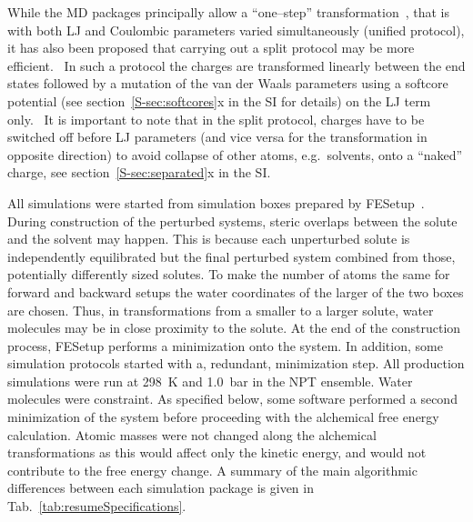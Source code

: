 \documentclass[journal=jctcce,manuscript=article]{achemso}
\begin{document}
While the MD packages principally allow a ``one--step''
transformation~\cite{steinbrecher_soft-core_2011},
that is with both LJ and Coulombic parameters varied
simultaneously (unified protocol), it has also been proposed that carrying out a
split protocol may be more efficient.~\cite{Deng-2004, naden_linear_2014, naden_linear_2015}
In such a protocol the charges are transformed
linearly between the end states followed by a mutation of the van der
Waals parameters using a softcore
potential (see section~\ref{S-sec:softcores}x in the
SI for details) on the LJ term only.~\cite{beutler_avoiding_1994,
  zacharias_separationshifted_1994}  It is important to note that in the split protocol, charges have to be switched off before LJ parameters (and vice versa
for the transformation in opposite direction) to avoid collapse of
other atoms, e.g.\ solvents, onto a ``naked''
charge,\cite{pitera_comparison_2002, anwar_robust_2005,
steinbrecher_soft-core_2011} see section~\ref{S-sec:separated}x in the SI.

All simulations were started from simulation boxes prepared by
FESetup~\cite{loeffler_fesetup:_2015}.  During construction of the
perturbed systems, steric overlaps between the solute and the
solvent may happen.  This is because each unperturbed solute is independently
equilibrated but the final perturbed system combined from those, potentially
differently sized solutes.  To make the number of atoms the same for forward
and backward setups the water coordinates of the larger of the two boxes are
chosen.  Thus, in transformations from a smaller to a larger solute, water
molecules may be in close proximity to the solute.  At the end of the
construction process, FESetup performs a minimization onto the
system.  In addition, some simulation protocols started with a,
redundant, minimization step.  All production simulations were run at
\SI{298}{K} and \SI{1.0}{bar} in the NPT ensemble.  Water molecules
were constraint.  As specified below, some software performed a second
minimization of the system before proceeding with the alchemical free
energy calculation.  Atomic masses were not changed along the
alchemical transformations as this would affect only the kinetic
energy, and would not contribute to the free energy change.
A summary of the main algorithmic differences between each simulation package is given in
Tab.~\ref{tab:resumeSpecifications}.



%
\end{document}
